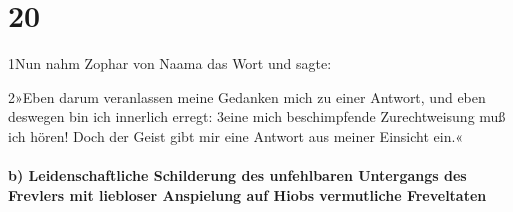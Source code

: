 \hypertarget{section-19}{%
\section{20}\label{section-19}}

1Nun nahm Zophar von Naama das Wort und sagte:

2»Eben darum veranlassen meine Gedanken mich zu einer Antwort, und eben
deswegen bin ich innerlich erregt: 3eine mich beschimpfende
Zurechtweisung muß ich hören! Doch der Geist gibt mir eine Antwort aus
meiner Einsicht ein.«

\hypertarget{b-leidenschaftliche-schilderung-des-unfehlbaren-untergangs-des-frevlers-mit-liebloser-anspielung-auf-hiobs-vermutliche-freveltaten}{%
\paragraph{b) Leidenschaftliche Schilderung des unfehlbaren Untergangs
des Frevlers mit liebloser Anspielung auf Hiobs vermutliche
Freveltaten}\label{b-leidenschaftliche-schilderung-des-unfehlbaren-untergangs-des-frevlers-mit-liebloser-anspielung-auf-hiobs-vermutliche-freveltaten}}

